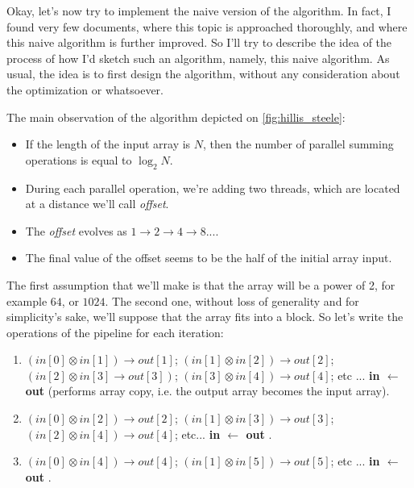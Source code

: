 Okay, let's now try to implement the naive version of the algorithm. In fact, I found very few documents, where this topic is 
approached thoroughly, and where this naive algorithm is further improved. 
So I'll try to describe the idea of the process of how I'd sketch such an algorithm, namely, this naive algorithm.
As usual, the idea is to first design the algorithm, without any consideration about the optimization or whatsoever. 


The main observation of the algorithm depicted on \autoref{fig:hillis_steele}:
\begin{itemize}
   \setlength\itemsep{-0.5em}
  \item If the length of the input array is $N$, then the number of parallel summing operations is equal to $\log_2 N$.
  \item During each parallel operation, we're adding two threads, which are located at a distance we'll call \textsl{offset}.
  \item The \textsl{offset} evolves as $1 \xrightarrow{} 2 \xrightarrow{} 4 \xrightarrow{} 8 ...$.
  \item The final value of the offset seems to be the half of the initial array input.
\end{itemize}

The first assumption that we'll make is that the array will be a power of 2, for example $64$, or $1024$.
The second one, without loss of generality and for simplicity's sake, we'll suppose that the array fits 
into a block. So let's write the operations 
of the pipeline for each iteration: 
\begin{enumerate}
   \setlength\itemsep{-0.5em}
  \item $(in[0] \otimes in[1])\xrightarrow{} out[1]$; $(in[1] \otimes in[2]) \xrightarrow{} out[2]$; $(in[2] \otimes in[3] \xrightarrow{} out[3]) $; $(in[3] \otimes in[4]) \xrightarrow{} out[4]$; etc ...
    \textbf{in $\xleftarrow{}$ out } (performs array copy, i.e. the output array becomes the input array).
  \item $(in[0] \otimes in[2]) \xrightarrow{} out[2]$; $(in[1] \otimes in[3]) \xrightarrow{} out[3]$;
    $(in[2] \otimes in[4]) \xrightarrow{} out[4]$; etc... \textbf{in $\xleftarrow{}$ out }.
  \item $(in[0] \otimes in[4]) \xrightarrow{} out[4]$; $(in[1] \otimes in[5]) \xrightarrow{} out[5]$; etc ... \textbf{in $\xleftarrow{}$ out }.
\end{enumerate}

